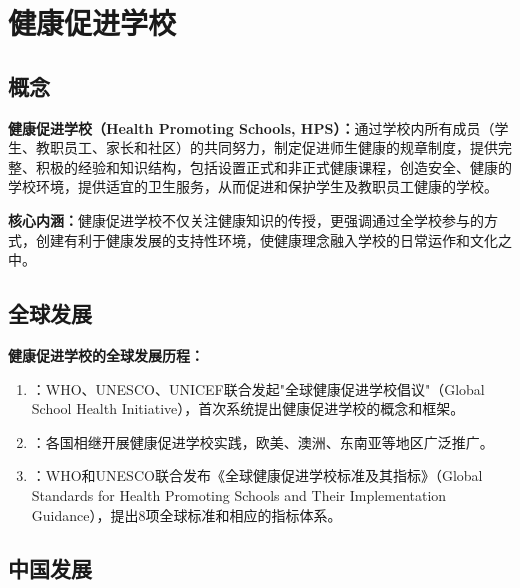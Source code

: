 \section{健康促进学校}

\subsection{概念}

\begin{defbox}
\textbf{健康促进学校（Health Promoting Schools, HPS）：}通过学校内所有成员（学生、教职员工、家长和社区）的共同努力，制定促进师生健康的规章制度，提供完整、积极的经验和知识结构，包括设置正式和非正式健康课程，创造安全、健康的学校环境，提供适宜的卫生服务，从而促进和保护学生及教职员工健康的学校。

\textbf{核心内涵：}健康促进学校不仅关注健康知识的传授，更强调通过全学校参与的方式，创建有利于健康发展的支持性环境，使健康理念融入学校的日常运作和文化之中。
\end{defbox}

\subsection{全球发展}

\begin{keybox}
\textbf{健康促进学校的全球发展历程：}
\begin{enumerate}[leftmargin=*]
    \item {}：WHO、UNESCO、UNICEF联合发起"全球健康促进学校倡议"（Global School Health Initiative），首次系统提出健康促进学校的概念和框架。
    \item {}：各国相继开展健康促进学校实践，欧美、澳洲、东南亚等地区广泛推广。
    \item {}：WHO和UNESCO联合发布《全球健康促进学校标准及其指标》（Global Standards for Health Promoting Schools and Their Implementation Guidance），提出8项全球标准和相应的指标体系。
\end{enumerate}
\end{keybox}

\subsection{中国发展}

